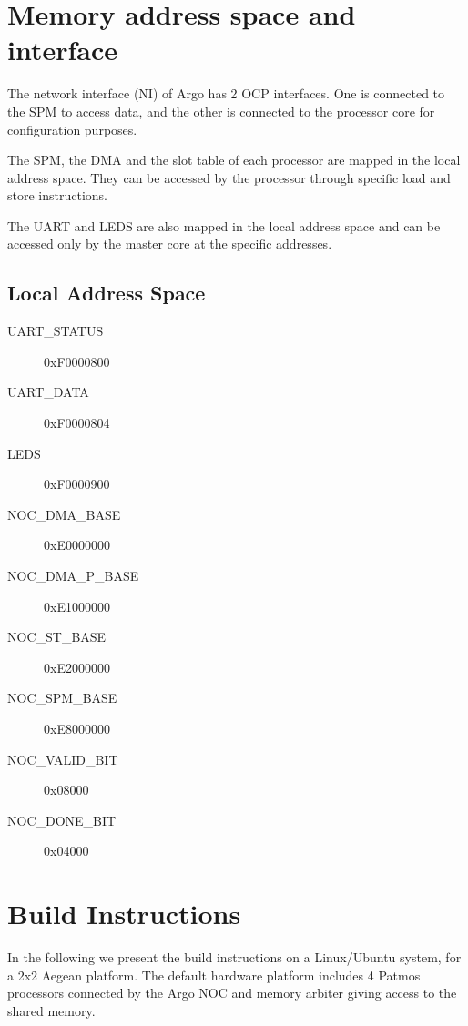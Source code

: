 \documentclass[a4paper,fontsize=10pt,twoside,DIV15,BCOR12mm,headinclude=true,footinclude=false,pagesize,bibtotoc]{scrbook}
\begin{document}
\section{Memory address space and interface}
\label{sec:mem}

The network interface (NI) of Argo has 2 OCP \cite{ocp:spec} interfaces. One is connected to the SPM
to access data, and the other is connected to the processor core for configuration purposes.

The SPM, the DMA and the slot table of each processor are mapped in the local address space.
They can be accessed by the processor through specific load and store instructions.

The UART and LEDS are also mapped in the local address space and can be accessed only by the master core
at the specific addresses.

\subsection{Local Address Space}

\begin{description}
\item[UART\_STATUS]      0xF0000800
\item[UART\_DATA]        0xF0000804
\item[LEDS]              0xF0000900
\item[NOC\_DMA\_BASE]    0xE0000000
\item[NOC\_DMA\_P\_BASE] 0xE1000000
\item[NOC\_ST\_BASE]     0xE2000000
\item[NOC\_SPM\_BASE]    0xE8000000
\item[NOC\_VALID\_BIT]   0x08000
\item[NOC\_DONE\_BIT]    0x04000
\end{description}


\section{Build Instructions}

In the following we present the build instructions on a Linux/Ubuntu system,
for a 2x2 Aegean platform. The default hardware platform includes 4 Patmos processors 
connected by the Argo NOC and memory arbiter giving access to the shared memory.
\end{document}
